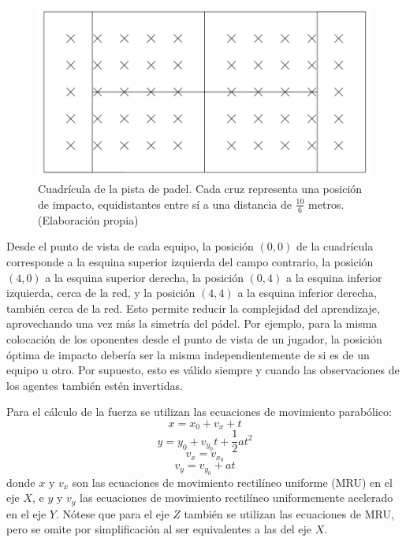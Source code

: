 \begin{figure}[H]
    \centering
    \includegraphics[width= 15cm]{figures/grid-padel.jpg}
    \caption[Cuadrícula de la pista de padel]{Cuadrícula de la pista de padel. Cada cruz representa una posición de impacto, equidistantes entre sí a una distancia de $\frac{10}{6}$ metros. (Elaboración propia)}
    \label{fig:grid-padel}
\end{figure}

Desde el punto de vista de cada equipo, la posición $(0, 0)$ de la cuadrícula corresponde a la esquina superior izquierda del campo contrario, la posición $(4, 0)$ a la esquina superior derecha, la posición $(0,4)$ a la esquina inferior izquierda, cerca de la red, y la posición $(4,4)$ a la esquina inferior derecha, también cerca de la red. Esto permite reducir la complejidad del aprendizaje, aprovechando una vez más la simetría del pádel. Por ejemplo, para la misma colocación de los oponentes desde el punto de vista de un jugador, la posición óptima de impacto debería ser la misma independientemente de si es de un equipo u otro. Por supuesto, esto es válido siempre y cuando las observaciones de los agentes también estén invertidas.

Para el cálculo de la fuerza se utilizan las ecuaciones de movimiento parabólico:
\begin{equation}
    x = x_0 + v_x + t
\end{equation}
\begin{equation}
    y = y_0 + v_{y_0} t + \frac{1}{2} a t^2
    \label{eq:mrua-y}
\end{equation}
\begin{equation}
    v_x = v_{x_0}
\end{equation}
\begin{equation}
    v_y = v_{y_0} + a t
\end{equation}
donde $x$ y $v_x$ son las ecuaciones de movimiento rectilíneo uniforme (MRU) en el eje $X$, e $y$ y $v_y$ las ecuaciones de movimiento rectilíneo uniformemente acelerado en el eje $Y$. Nótese que para el eje $Z$ también se utilizan las ecuaciones de MRU, pero se omite por simplificación al ser equivalentes a las del eje $X$.

